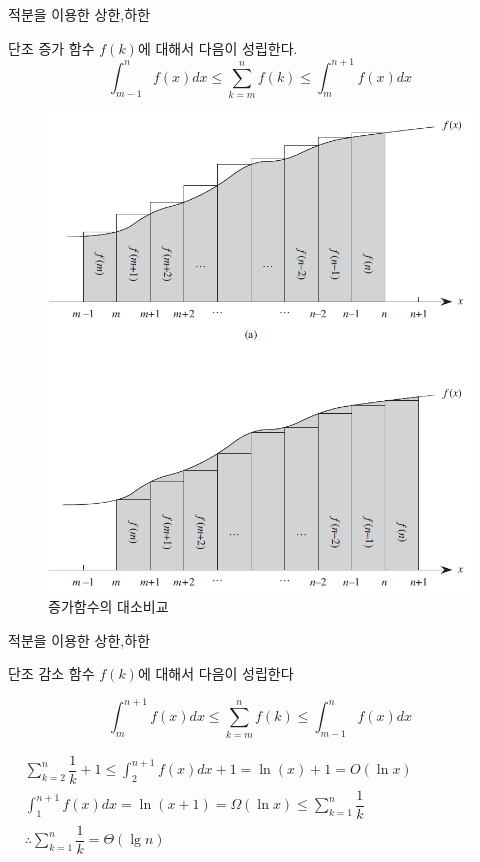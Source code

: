 \documentclass[10pt]{beamer}
\begin{document}
\begin{frame}{적분을 이용한 상한,하한}

    단조 증가 함수 $f(k)$에 대해서 다음이 성립한다.
    $$\int_{m-1}^{n}f(x)dx \le \sum_{k=m}^n f(k) \le \int_{m}^{n+1}f(x)dx$$
    
    \begin{figure}[h!]
        \centering
        \includegraphics[scale=0.5]{./QuickSort/pic/q5.png}
        \caption{증가함수의 대소비교\cite{reference1}}
    \end{figure}
    
\end{frame}


\begin{frame}{적분을 이용한 상한,하한}

    단조 감소 함수 $f(k)$에 대해서 다음이 성립한다

    $$ \int_{m}^{n+1}f(x)dx \le \sum_{k=m}^n f(k) \le\int_{m-1}^{n}f(x)dx $$

\end{frame}




\begin{frame}{}
$    
\begin{aligned}
        &\sum_{k=2}^n \dfrac{1}{k}+1 \le \int_{2}^{n+1}f(x)dx +1= \ln (x)+1 = O(\ln x) \\
        &\int_{1}^{n+1}f(x)dx =\ln (x+1) = \Omega(\ln x) \le \sum_{k=1}^n \dfrac{1}{k}  \\
        & \therefore  \sum_{k=1}^n \dfrac{1}{k} = \Theta(\lg n)
    \end{aligned}
$
\end{frame}
\end{document}
